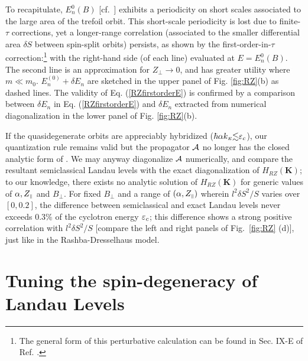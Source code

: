 \documentclass[aps, prb, showpacs, twocolumn, notitlepage, superscriptaddress]{revtex4-1}
\begin{document}
To recapitulate, $E_n^0(B)$ [cf.\ ] exhibits a periodicity on short scales associated to the large area of the trefoil orbit. This short-scale periodicity is lost due to  finite-$\tau$ corrections, yet a longer-range correlation (associated to the smaller differential area $\delta S$ between spin-split orbits) persists, as shown by the first-order-in-$\tau$ correction:\footnote{The general form of this perturbative calculation can be found in Sec. IX-E of Ref. .} 
with the right-hand side (of each line) evaluated at $E{=}E_n^0(B)$. The second line is an approximation for $Z_{\perp}{\rightarrow}0$, and has greater utility where $m{\ll}m_0$. $E_n^{(0)}+\delta E_n$ are sketched in the upper panel of Fig. \ref{fig:RZ}(b) as dashed lines. The validity of Eq. (\ref{RZfirstorderE}) is confirmed by a comparison between $\delta E_n$ in Eq. (\ref{RZfirstorderE}) and $\delta E_n$ extracted from numerical diagonalization in the lower panel of Fig. \ref{fig:RZ}(b).

If the quasidegenerate orbits are appreciably hybridized ($\hbar\alpha k_{\scriptscriptstyle{E}}{\lesssim}\varepsilon_c$), our quantization rule  remains valid but the propagator ${\cal A}$ no longer has the closed analytic form of . We may anyway diagonalize ${\cal A}$ numerically, and compare the resultant semiclassical Landau levels with the exact diagonalization of $H_{RZ}(\boldsymbol{K})$; to our knowledge, there exists no analytic solution of $H_{RZ}(\boldsymbol{K})$ for generic values of $\alpha,Z_{\scriptscriptstyle{\parallel}}$ and $B_{\perp}$. For fixed  $B_{\perp}$ and a range of $(\alpha,Z_{\scriptscriptstyle{\parallel}})$ wherein  $l^2\delta S^2/S$ varies over $[0,0.2]$, the difference between semiclassical and exact Landau levels never exceeds  0.3\% of the cyclotron energy $\varepsilon_c$; this difference shows a strong positive correlation with $l^2\delta S^2/S$ [compare the left and right panels of Fig.\ \ref{fig:RZ} (d)], just like in the Rashba-Dresselhaus model. 

\section{Tuning the spin-degeneracy of Landau Levels}\label{sec:llquasideg}
\end{document}
